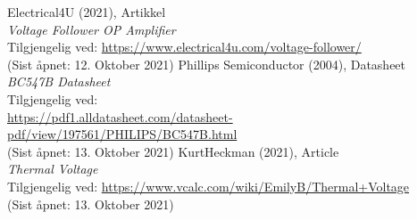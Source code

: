 \documentclass[a4paper,11pt,norsk]{article}
\begin{document}
\begin{thebibliography}{9}
    Electrical4U (2021), Artikkel \\
    \emph{Voltage Follower OP Amplifier} \\
    Tilgjengelig ved: \href{https://www.electrical4u.com/voltage-follower/}{https://www.electrical4u.com/voltage-follower/} \\
    (Sist åpnet: 12. Oktober 2021)
    Phillips Semiconductor (2004), Datasheet \\
    \emph{BC547B Datasheet} \\
    Tilgjengelig ved: \\
    \href{https://pdf1.alldatasheet.com/datasheet-pdf/view/197561/PHILIPS/BC547B.html}{https://pdf1.alldatasheet.com/datasheet-pdf/view/197561/PHILIPS/BC547B.html} \\
    (Sist åpnet: 13. Oktober 2021)    
    KurtHeckman (2021), Article \\
    \emph{Thermal Voltage} \\
    Tilgjengelig ved: \href{https://www.vcalc.com/wiki/EmilyB/Thermal+Voltage}{https://www.vcalc.com/wiki/EmilyB/Thermal+Voltage} \\
    (Sist åpnet: 13. Oktober 2021) 
\end{thebibliography}

\newpage

\appendix
\end{document}
